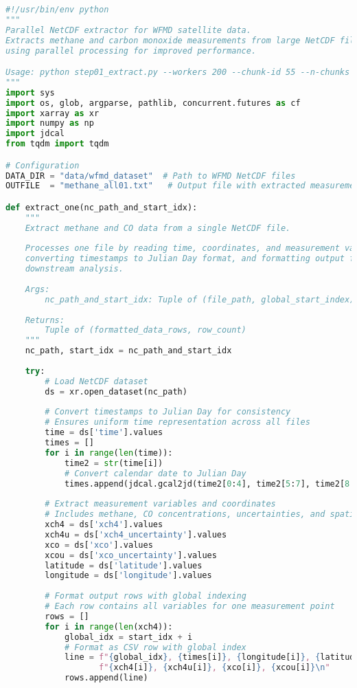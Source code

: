 \begin{lstlisting}[language=Python, caption=Parallel NetCDF Data Extraction Algorithm, label=alg:step01_extract, breaklines=true]
#!/usr/bin/env python
"""
Parallel NetCDF extractor for WFMD satellite data.
Extracts methane and carbon monoxide measurements from large NetCDF files
using parallel processing for improved performance.

Usage: python step01_extract.py --workers 200 --chunk-id 55 --n-chunks 100
"""
import sys
import os, glob, argparse, pathlib, concurrent.futures as cf
import xarray as xr
import numpy as np
import jdcal
from tqdm import tqdm

# Configuration
DATA_DIR = "data/wfmd_dataset"  # Path to WFMD NetCDF files
OUTFILE  = "methane_all01.txt"   # Output file with extracted measurements

def extract_one(nc_path_and_start_idx):
    """
    Extract methane and CO data from a single NetCDF file.
    
    Processes one file by reading time, coordinates, and measurement variables,
    converting timestamps to Julian Day format, and formatting output for
    downstream analysis.
    
    Args:
        nc_path_and_start_idx: Tuple of (file_path, global_start_index)
        
    Returns:
        Tuple of (formatted_data_rows, row_count)
    """
    nc_path, start_idx = nc_path_and_start_idx
    
    try:
        # Load NetCDF dataset
        ds = xr.open_dataset(nc_path)
        
        # Convert timestamps to Julian Day for consistency
        # Ensures uniform time representation across all files
        time = ds['time'].values
        times = []
        for i in range(len(time)):
            time2 = str(time[i])
            # Convert calendar date to Julian Day
            times.append(jdcal.gcal2jd(time2[0:4], time2[5:7], time2[8:10])[1])
        
        # Extract measurement variables and coordinates
        # Includes methane, CO concentrations, uncertainties, and spatial coordinates
        xch4 = ds['xch4'].values
        xch4u = ds['xch4_uncertainty'].values
        xco = ds['xco'].values
        xcou = ds['xco_uncertainty'].values
        latitude = ds['latitude'].values
        longitude = ds['longitude'].values
        
        # Format output rows with global indexing
        # Each row contains all variables for one measurement point
        rows = []
        for i in range(len(xch4)):
            global_idx = start_idx + i
            # Format as CSV row with global index
            line = f"{global_idx}, {times[i]}, {longitude[i]}, {latitude[i]}, " \
                   f"{xch4[i]}, {xch4u[i]}, {xco[i]}, {xcou[i]}\n"
            rows.append(line)
        

\end{lstlisting}
